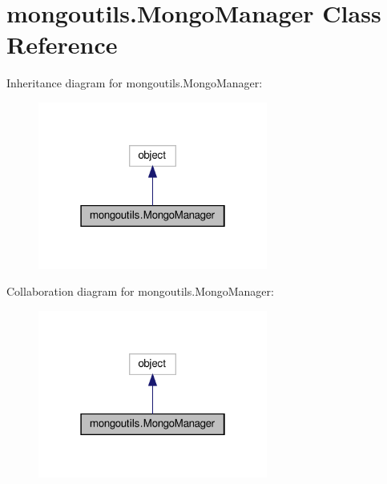 \hypertarget{classmongoutils_1_1MongoManager}{}\section{mongoutils.\+Mongo\+Manager Class Reference}
\label{classmongoutils_1_1MongoManager}


Inheritance diagram for mongoutils.\+Mongo\+Manager\+:
\nopagebreak
\begin{figure}[H]
\begin{center}
\leavevmode
\includegraphics[width=214pt]{classmongoutils_1_1MongoManager__inherit__graph}
\end{center}
\end{figure}


Collaboration diagram for mongoutils.\+Mongo\+Manager\+:
\nopagebreak
\begin{figure}[H]
\begin{center}
\leavevmode
\includegraphics[width=214pt]{classmongoutils_1_1MongoManager__coll__graph}
\end{center}
\end{figure}
